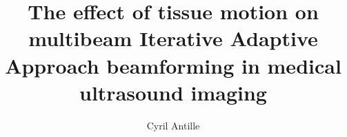 \documentclass[a4paper,UKenglish]{modules/ifimaster}
\author{Cyril Antille}
\title{The effect of tissue motion on multibeam Iterative Adaptive Approach beamforming in medical ultrasound imaging}
\begin{document}
    \masterfrontpage
    
    
    \frontmatter{}
    
    
    \tableofcontents{}
    \listoffigures{}
    \listoftables{}
    
    \mainmatter{}
    
    
    
    
    
    
    
    
    
    
    \backmatter{}
    
\end{document}
